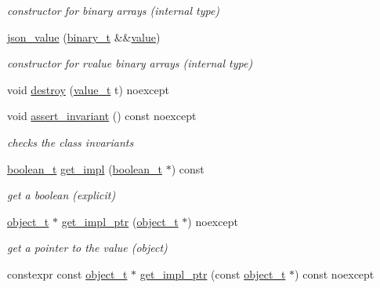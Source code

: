 \begin{DoxyCompactItemize}
\begin{DoxyCompactList}\small\item\em constructor for binary arrays (internal type) \end{DoxyCompactList}\item 
\hyperlink{classnlohmann_1_1basic__json_ac7bb152c454b4d837d943cfb541da510}{json\+\_\+value} (\hyperlink{classnlohmann_1_1basic__json_ad6c955145bebde84d93991ffed7cd389}{binary\+\_\+t} \&\&\hyperlink{classnlohmann_1_1basic__json_ac9e014095170d72c4c57e3daf8efc059}{value})
\begin{DoxyCompactList}\small\item\em constructor for rvalue binary arrays (internal type) \end{DoxyCompactList}\item 
void \hyperlink{classnlohmann_1_1basic__json_adca9bb93a7bfa43bdae38dd8493cc042}{destroy} (\hyperlink{namespacenlohmann_1_1detail_a1ed8fc6239da25abcaf681d30ace4985}{value\+\_\+t} t) noexcept
\item 
void \hyperlink{classnlohmann_1_1basic__json_aa7e7b1bdb6e9dbcfa5e284e8a2fb6464}{assert\+\_\+invariant} () const noexcept
\begin{DoxyCompactList}\small\item\em checks the class invariants \end{DoxyCompactList}\item 
\hyperlink{classnlohmann_1_1basic__json_a44fd1a12c9c54623c942b430e7a72937}{boolean\+\_\+t} \hyperlink{classnlohmann_1_1basic__json_a6db0accaeb1dbd76c166bdf872357dfe}{get\+\_\+impl} (\hyperlink{classnlohmann_1_1basic__json_a44fd1a12c9c54623c942b430e7a72937}{boolean\+\_\+t} $\ast$) const 
\begin{DoxyCompactList}\small\item\em get a boolean (explicit) \end{DoxyCompactList}\item 
\hyperlink{classnlohmann_1_1basic__json_a5e3df077f880583a96d74cd63e173cb2}{object\+\_\+t} $\ast$ \hyperlink{classnlohmann_1_1basic__json_a8b71cea6588f74f6eab6cc27ae314e5c}{get\+\_\+impl\+\_\+ptr} (\hyperlink{classnlohmann_1_1basic__json_a5e3df077f880583a96d74cd63e173cb2}{object\+\_\+t} $\ast$) noexcept
\begin{DoxyCompactList}\small\item\em get a pointer to the value (object) \end{DoxyCompactList}\item 
constexpr const \hyperlink{classnlohmann_1_1basic__json_a5e3df077f880583a96d74cd63e173cb2}{object\+\_\+t} $\ast$ \hyperlink{classnlohmann_1_1basic__json_a7577c2bbaf8da92947b964ae935a57c3}{get\+\_\+impl\+\_\+ptr} (const \hyperlink{classnlohmann_1_1basic__json_a5e3df077f880583a96d74cd63e173cb2}{object\+\_\+t} $\ast$) const noexcept

\end{DoxyCompactItemize}
